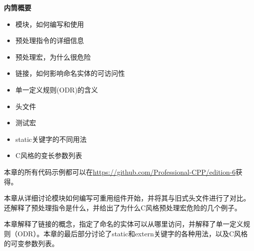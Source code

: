 \noindent
\textbf{内筒概要}

\begin{itemize}
\item
模块，如何编写和使用

\item
预处理指令的详细信息

\item
预处理宏，为什么很危险

\item
链接，如何影响命名实体的可访问性

\item
单一定义规则(ODR)的含义

\item
头文件

\item
测试宏

\item
static关键字的不同用法

\item
C风格的变长参数列表
\end{itemize}

本章的所有代码示例都可以在\url{https://github.com/Professional-CPP/edition-6}获得。

本章从详细讨论模块如何编写可重用组件开始，并将其与旧式头文件进行了对比。还解释了预处理指令是什么，并给出了为什么C风格预处理宏危险的几个例子。

本章解释了链接的概念，指定了命名的实体可以从哪里访问，并解释了单一定义规则（ODR）。本章的最后部分讨论了static和extern关键字的各种用法，以及C风格的可变参数列表。































